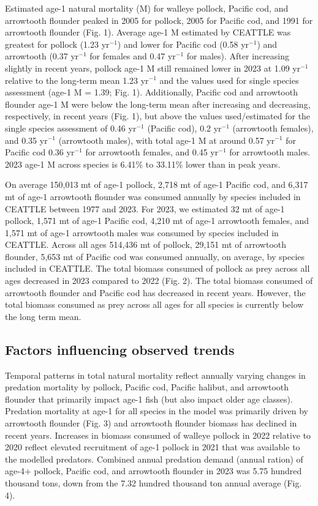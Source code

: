 \documentclass[
]{article}
\begin{document}
Estimated age-1 natural mortality (M) for walleye pollock, Pacific cod,
and arrowtooth flounder peaked in 2005 for pollock, 2005 for Pacific
cod, and 1991 for arrowtooth flounder (Fig. 1). Average age-1 M
estimated by CEATTLE was greatest for pollock (1.23 yr\(^{-1}\)) and
lower for Pacific cod (0.58 yr\(^{-1}\)) and arrowtooth (0.37
yr\(^{-1}\) for females and 0.47 yr\(^{-1}\) for males). After
increasing slightly in recent years, pollock age-1 M still remained
lower in 2023 at 1.09 yr\(^{-1}\) relative to the long-term mean 1.23
yr\(^{-1}\) and the values used for single species assessment (age-1 M =
1.39; Fig. 1). Additionally, Pacific cod and arrowtooth flounder age-1 M
were below the long-term mean after increasing and decreasing,
respectively, in recent years (Fig. 1), but above the values
used/estimated for the single species assessment of 0.46 yr\(^{-1}\)
(Pacific cod), 0.2 yr\(^{-1}\) (arrowtooth females), and 0.35
yr\(^{-1}\) (arrowtooth males), with total age-1 M at around 0.57
yr\(^{-1}\) for Pacific cod 0.36 yr\(^{-1}\) for arrowtooth females, and
0.45 yr\(^{-1}\) for arrowtooth males. 2023 age-1 M across species is
6.41\% to 33.11\% lower than in peak years.

On average 150,013 mt of age-1 pollock, 2,718 mt of age-1 Pacific cod,
and 6,317 mt of age-1 arrowtooth flounder was consumed annually by
species included in CEATTLE between 1977 and 2023. For 2023, we
estimated 32 mt of age-1 pollock, 1,571 mt of age-1 Pacific cod, 4,210
mt of age-1 arrowtooth females, and 1,571 mt of age-1 arrowtooth males
was consumed by species included in CEATTLE. Across all ages 514,436 mt
of pollock, 29,151 mt of arrowtooth flounder, 5,653 mt of Pacific cod
was consumed annually, on average, by species included in CEATTLE. The
total biomass consumed of pollock as prey across all ages decreased in
2023 compared to 2022 (Fig. 2). The total biomass consumed of arrowtooth
flounder and Pacific cod has decreased in recent years. However, the
total biomass consumed as prey across all ages for all species is
currently below the long term mean.

\hypertarget{factors-influencing-observed-trends}{%
\subsection{Factors influencing observed
trends}\label{factors-influencing-observed-trends}}

Temporal patterns in total natural mortality reflect annually varying
changes in predation mortality by pollock, Pacific cod, Pacific halibut,
and arrowtooth flounder that primarily impact age-1 fish (but also
impact older age classes). Predation mortality at age-1 for all species
in the model was primarily driven by arrowtooth flounder (Fig. 3) and
arrowtooth flounder biomass has declined in recent years. Increases in
biomass consumed of walleye pollock in 2022 relative to 2020 reflect
elevated recruitment of age-1 pollock in 2021 that was available to the
modelled predators. Combined annual predation demand (annual ration) of
age-4+ pollock, Pacific cod, and arrowtooth flounder in 2023 was 5.75
hundred thousand tons, down from the 7.32 hundred thousand ton annual
average (Fig. 4).
\end{document}
